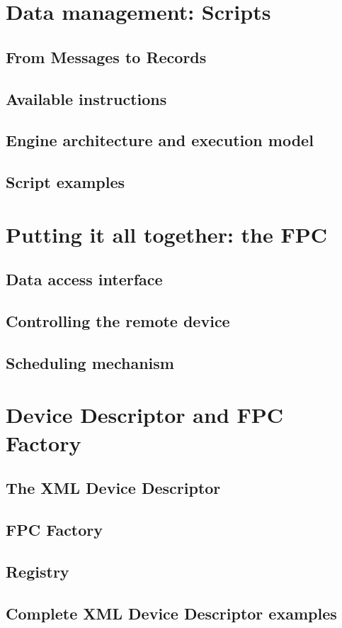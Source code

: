 \section{Data management: Scripts}

\subsection{From Messages to Records}

\subsection{Available instructions}

\subsection{Engine architecture and execution model}

\subsection{Script examples}


\section{Putting it all together: the FPC}

\subsection{Data access interface}

\subsection{Controlling the remote device}

\subsection{Scheduling mechanism}


\section{Device Descriptor and FPC Factory}

\subsection{The XML Device Descriptor}

\subsection{FPC Factory}

\subsection{Registry}

\subsection{Complete XML Device Descriptor examples}